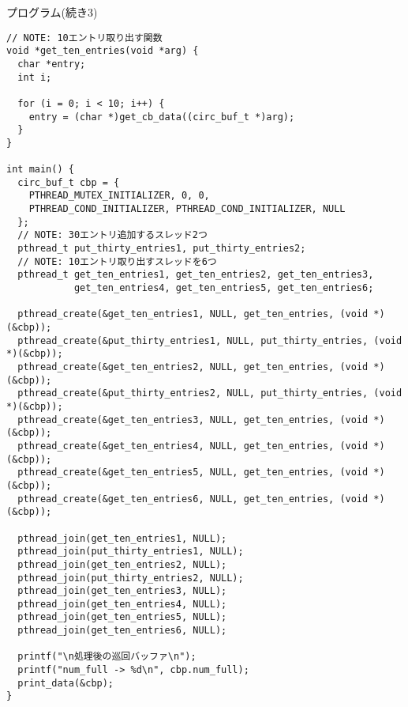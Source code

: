 \documentclass[10pt]{jarticle}
\begin{document}
\begin{itembox}[l]{プログラム(続き3)}
  \begin{verbatim}
// NOTE: 10エントリ取り出す関数
void *get_ten_entries(void *arg) {
  char *entry;
  int i;

  for (i = 0; i < 10; i++) {
    entry = (char *)get_cb_data((circ_buf_t *)arg);
  }
}

int main() {
  circ_buf_t cbp = {
    PTHREAD_MUTEX_INITIALIZER, 0, 0,
    PTHREAD_COND_INITIALIZER, PTHREAD_COND_INITIALIZER, NULL
  };
  // NOTE: 30エントリ追加するスレッド2つ
  pthread_t put_thirty_entries1, put_thirty_entries2;
  // NOTE: 10エントリ取り出すスレッドを6つ
  pthread_t get_ten_entries1, get_ten_entries2, get_ten_entries3,
            get_ten_entries4, get_ten_entries5, get_ten_entries6;

  pthread_create(&get_ten_entries1, NULL, get_ten_entries, (void *)(&cbp));
  pthread_create(&put_thirty_entries1, NULL, put_thirty_entries, (void *)(&cbp));
  pthread_create(&get_ten_entries2, NULL, get_ten_entries, (void *)(&cbp));
  pthread_create(&put_thirty_entries2, NULL, put_thirty_entries, (void *)(&cbp));
  pthread_create(&get_ten_entries3, NULL, get_ten_entries, (void *)(&cbp));
  pthread_create(&get_ten_entries4, NULL, get_ten_entries, (void *)(&cbp));
  pthread_create(&get_ten_entries5, NULL, get_ten_entries, (void *)(&cbp));
  pthread_create(&get_ten_entries6, NULL, get_ten_entries, (void *)(&cbp));

  pthread_join(get_ten_entries1, NULL);
  pthread_join(put_thirty_entries1, NULL);
  pthread_join(get_ten_entries2, NULL);
  pthread_join(put_thirty_entries2, NULL);
  pthread_join(get_ten_entries3, NULL);
  pthread_join(get_ten_entries4, NULL);
  pthread_join(get_ten_entries5, NULL);
  pthread_join(get_ten_entries6, NULL);

  printf("\n処理後の巡回バッファ\n");
  printf("num_full -> %d\n", cbp.num_full);
  print_data(&cbp);
}
  \end{verbatim}
\end{itembox}
\end{document}
